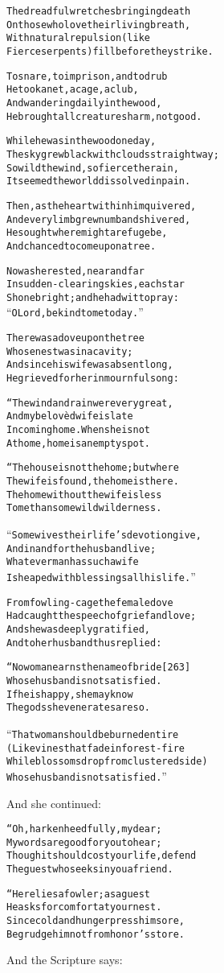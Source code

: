 \documentclass{article}
\renewenvironment{verbatim}{\begin{alltt}\normalfont\begin{centering}}{\end{centering}\end{alltt}}
\begin{document}
\begin{verbatim}
The dreadful wretches bringing death
On those who love their living breath,
With natural repulsion (like
Fierce serpents) fill before they strike.

To snare, to imprison, and to drub
He took a net, a cage, a club,
And wandering daily in the wood,
He brought all creatures harm, not good.

While he was in the wood one day,
The sky grew black with clouds straightway;
So wild the wind, so fierce the rain,
It seemed the world dissolved in pain.

Then, as the heart within him quivered,
And every limb grew numb and shivered,
He sought where might a refuge be,
And chanced to come upon a tree.

Now as he rested, near and far
In sudden-clearing skies, each star
Shone bright; and he had wit to pray:
“O Lord, be kind to me today.”

There was a dove upon the tree
Whose nest was in a cavity;
And since his wife was absent long,
He grieved for her in mournful song:

“The wind and rain were very great,
And my belovèd wife is late
In coming home. When she is not
At home, home is an empty spot.

“The house is not the home; but where
The wife is found, the home is there.
The home without the wife is less
To me than some wild wilderness.

“Some wives their life's devotion give,
And in and for the husband live;
Whatever man has such a wife
Is heaped with blessings all his life.”

From fowling-cage the female dove
Had caught the speech of grief and love;
And she was deeply gratified,
And to her husband thus replied:

“No woman earns the name of bride                       [263]
Whose husband is not satisfied.
If he is happy, she may know
The gods she venerates are so.

“That woman should be burned entire
(Like vines that fade in forest-fire
While blossoms drop from clustered side)
Whose husband is not satisfied.”
\end{verbatim}
And she continued:

\begin{verbatim}
“Oh, harken heedfully, my dear;
My words are good for you to hear;
Though it should cost your life, defend
The guest who seeks in you a friend.

“Here lies a fowler; as a guest
He asks for comfort at your nest.
Since cold and hunger press him sore,
Begrudge him not from honor's store.
\end{verbatim}
And the Scripture says:
\end{document}
